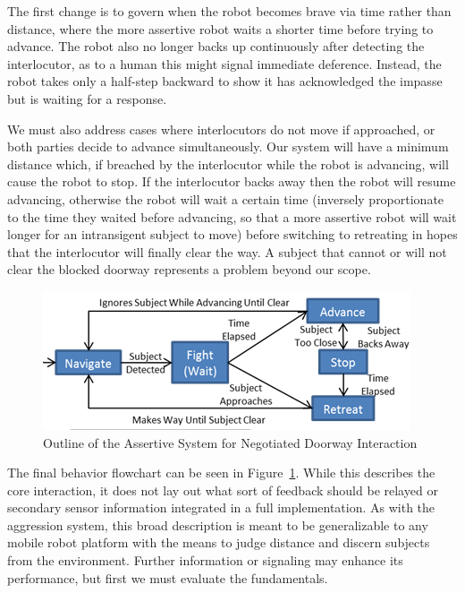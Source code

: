 \documentclass[letterpaper, 10 pt, conference]{ieeeconf}  %
\begin{document}
The first change is to govern when the robot becomes brave via time rather than distance, where the more assertive robot waits a shorter time before trying to advance. The robot also no longer backs up continuously after detecting the interlocutor, as to a human this might signal immediate deference. Instead, the robot takes only a half-step backward to show it has acknowledged the impasse but is waiting for a response. 

We must also address cases where interlocutors do not move if approached, or both parties decide to advance simultaneously. Our system will have a minimum distance which, if breached by the interlocutor while the robot is advancing, will cause the robot to stop. If the interlocutor backs away then the robot will resume advancing, otherwise the robot will wait a certain time (inversely proportionate to the time they waited before advancing, so that a more assertive robot will wait longer for an intransigent subject to move) before switching to retreating in hopes that the interlocutor will finally clear the way. A subject that cannot or will not clear the blocked doorway represents a problem beyond our scope. 
 
    \begin{figure}
      \centering
      \includegraphics{assertive_behavior.png}
      \caption{Outline of the Assertive System for Negotiated Doorway Interaction}
      \label{fig:Assertive}
   \end{figure}
 


The final behavior flowchart can be seen in Figure~\ref{fig:Assertive}. While this describes the core interaction, it does not lay out what sort of feedback should be relayed or secondary sensor information integrated in a full implementation. As with the aggression system, this broad description is meant to be generalizable to any mobile robot platform with the means to judge distance and discern subjects from the environment. Further information or signaling may enhance its performance, but first we must evaluate the fundamentals.
\end{document}
